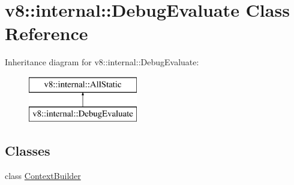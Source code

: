 \hypertarget{classv8_1_1internal_1_1_debug_evaluate}{}\section{v8\+:\+:internal\+:\+:Debug\+Evaluate Class Reference}
\label{classv8_1_1internal_1_1_debug_evaluate}
Inheritance diagram for v8\+:\+:internal\+:\+:Debug\+Evaluate\+:\begin{figure}[H]
\begin{center}
\leavevmode
\includegraphics[height=2.000000cm]{classv8_1_1internal_1_1_debug_evaluate}
\end{center}
\end{figure}
\subsection*{Classes}
\begin{DoxyCompactItemize}
\item 
class \hyperlink{classv8_1_1internal_1_1_debug_evaluate_1_1_context_builder}{Context\+Builder}
\end{DoxyCompactItemize}
